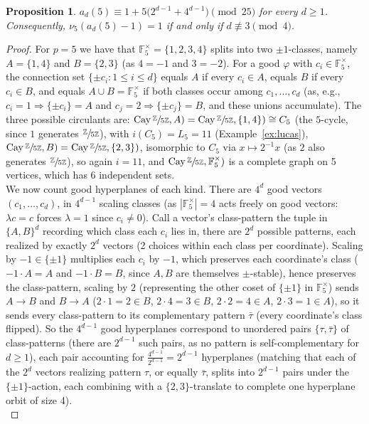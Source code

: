 \documentclass{article}
\theoremstyle{plain}
\newtheorem{proposition}[theorem]{Proposition}
\theoremstyle{definition}
\theoremstyle{remark}
\newcommand{\Z}{\mathbb{Z}}
\newcommand{\F}{\mathbb{F}}
\newcommand{\quot}[2]{\sfrac{#1}{#2}}
\DeclareMathOperator{\Cay}{Cay}
\begin{document}
\begin{proposition}\label{thm:p5}
$a_d(5)\equiv1+5\big(2^{d-1}+4^{d-1}\big)\pmod{25}$ for every $d\ge1$. Consequently, $\nu_5(a_d(5)-1)=1$ if and only if $d\not\equiv3\pmod4$.
\end{proposition}
\begin{proof}
For $p=5$ we have that $\F_5^\times=\{1,2,3,4\}$ splits into two $\pm1$-classes, namely $A=\{1,4\}$ and $B=\{2,3\}$ (as $4=-1$ and $3=-2$). For a good $\varphi$ with $c_i\in\F_5^\times$, the connection set $\{\pm c_i:1\le i\le d\}$ equals $A$ if every $c_i\in A$, equals $B$ if every $c_i\in B$, and equals $A\cup B=\F_5^\times$ if both classes occur among $c_1,\dots,c_d$ (as, e.g., $c_i=1\Rightarrow\{\pm c_i\}=A$ and $c_j=2\Rightarrow\{\pm c_j\}=B$, and these unions accumulate). The three possible circulants are: $\Cay\quot\Z{5\Z},A)=\Cay\quot\Z{5\Z},\{1,4\})\cong C_5$ (the $5$-cycle, since $1$ generates $\quot\Z{5\Z}$), with $i(C_5)=L_5=11$ (Example~\ref{ex:lucas}), $\Cay\quot\Z{5\Z},B)=\Cay\quot\Z{5\Z},\{2,3\})$, isomorphic to $C_5$ via $x\mapsto2^{-1}x$ (as $2$ also generates $\quot\Z{5\Z}$), so again $i=11$, and $\Cay\quot\Z{5\Z},\F_5^\times)$ is a complete graph on 5 vertices, which has $6$ independent sets.  \\

We now count good hyperplanes of each kind. There are $4^d$ good vectors $(c_1,\dots,c_d)$, in $4^{d-1}$ scaling classes (as $|\F_5^\times|=4$ acts freely on good vectors: $\lambda c=c$ forces $\lambda=1$ since $c_i\ne0$). Call a vector's class-pattern the tuple in $\{A,B\}^d$ recording which class each $c_i$ lies in, there are $2^d$ possible patterns, each realized by exactly $2^d$ vectors (2 choices within each class per coordinate). Scaling by $-1\in\{\pm1\}$ multiplies each $c_i$ by $-1$, which preserves each coordinate's class ($-1\cdot A=A$ and  $-1\cdot B=B$, since $A,B$ are themselves $\pm$-stable), hence preserves the class-pattern, scaling by $2$ (representing the other coset of $\{\pm1\}$ in $\F_5^\times$) sends $A\to B$ and $B\to A$ ($2\cdot1=2\in B$, $2\cdot4=3\in B$, $2\cdot2=4\in A$, $2\cdot3=1\in A$), so it sends every class-pattern to its complementary pattern $\bar\tau$ (every coordinate's class flipped). So the $4^{d-1}$ good hyperplanes correspond to unordered pairs $\{\tau,\bar\tau\}$ of class-patterns (there are $2^{d-1}$ such pairs, as no pattern is self-complementary for $d\ge1$), each pair accounting for $\frac{4^{d-1}}{2^{d-1}}=2^{d-1}$ hyperplanes (matching that each of the $2^d$ vectors realizing pattern $\tau$, or equally $\bar\tau$, splits into $2^{d-1}$ pairs under the $\{\pm1\}$-action, each combining with a $\{2,3\}$-translate to complete one hyperplane orbit of size 4).\\


\end{proof}
\end{document}
